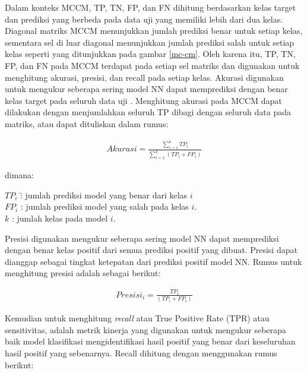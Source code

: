 Dalam konteks MCCM, TP, TN, FP, dan FN dihitung berdasarkan kelas target dan prediksi yang berbeda pada data uji yang memiliki lebih dari dua kelas. Diagonal matriks MCCM menunjukkan jumlah prediksi benar untuk setiap kelas, sementara sel di luar diagonal menunjukkan jumlah prediksi salah untuk setiap kelas seperti yang ditunjukkan pada gambar \ref{mc-cm}. Oleh karena itu, TP, TN, FP, dan FN pada MCCM terdapat pada setiap sel matriks dan digunakan untuk menghitung akurasi, presisi, dan recall pada setiap kelas.
Akurasi digunakan untuk mengukur seberapa sering model NN dapat memprediksi dengan benar kelas target pada seluruh data uji \citep{Powers2020}. Menghitung akurasi pada MCCM dapat dilakukan dengan menjumlahkan seluruh TP dibagi dengan seluruh data pada matriks, atau dapat dituliskan dalam rumus:

\begin{equation}
	\begin{aligned}
		Akurasi=\frac{\sum_{i=1}^{k}TP_i}{\sum_{i=1}^{k}(TP_i+FP_i)}
	\end{aligned}
\end{equation}

\hspace{-1,2cm}dimana:
\vspace{-0.5cm}
\begin{tabbing}
	$TP_{i}$ \hspace{2em} \= : jumlah prediksi model yang benar dari kelas $i$\\
	$FP_{i}$ \> : jumlah prediksi model yang salah pada kelas $i$. \\
	$k$ \> : jumlah kelas pada model $i$. \\
\end{tabbing}
\vspace{-0.5cm}

Presisi digunakan mengukur seberapa sering model NN dapat memprediksi dengan benar kelas positif dari semua prediksi positif yang dibuat. Presisi dapat dianggap sebagai tingkat ketepatan dari prediksi positif model NN. Rumus untuk menghitung presisi adalah sebagai berikut:

\begin{equation}
	\begin{aligned}
		Presisi_i =\frac{TP_i}{(TP_i+FP_i)}
	\end{aligned}
\end{equation}

Kemudian untuk menghitung \textit{recall} atau True Positive Rate (TPR) atau sensitivitas, adalah metrik kinerja yang digunakan untuk mengukur seberapa baik model klasifikasi mengidentifikasi hasil positif yang benar dari keseluruhan hasil positif yang sebenarnya. Recall dihitung dengan menggunakan rumus berikut:

